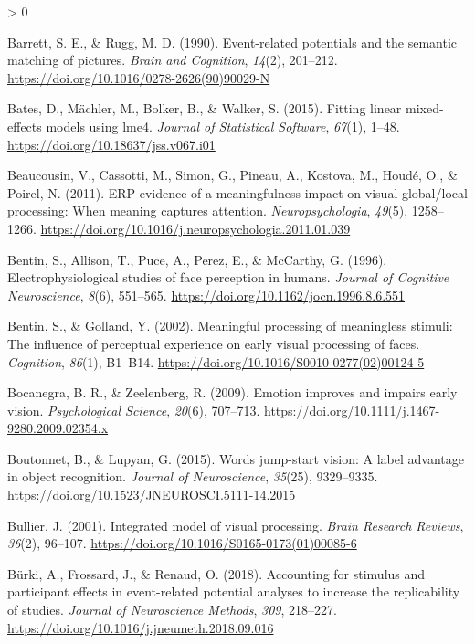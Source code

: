 \documentclass[
  english,
  doc,12pt,twoside,floatsintext]{apa7}
\newlength{\cslhangindent}
\newenvironment{CSLReferences}[2] %
 {%
  \setlength{\parindent}{0pt}
  \ifodd #1 \everypar{\setlength{\hangindent}{\cslhangindent}}\ignorespaces\fi
  \ifnum #2 > 0
  \setlength{\parskip}{#2\baselineskip}
  \fi
 }%
 {}
\begin{document}
\begin{CSLReferences}{1}{0}
\leavevmode\hypertarget{ref-barrett1990}{}%
Barrett, S. E., \& Rugg, M. D. (1990). Event-related potentials and the semantic matching of pictures. \emph{Brain and Cognition}, \emph{14}(2), 201--212. \url{https://doi.org/10.1016/0278-2626(90)90029-N}

\leavevmode\hypertarget{ref-R-lme4}{}%
Bates, D., Mächler, M., Bolker, B., \& Walker, S. (2015). Fitting linear mixed-effects models using {lme4}. \emph{Journal of Statistical Software}, \emph{67}(1), 1--48. \url{https://doi.org/10.18637/jss.v067.i01}

\leavevmode\hypertarget{ref-beaucousin2011}{}%
Beaucousin, V., Cassotti, M., Simon, G., Pineau, A., Kostova, M., Houdé, O., \& Poirel, N. (2011). ERP evidence of a meaningfulness impact on visual global/local processing: When meaning captures attention. \emph{Neuropsychologia}, \emph{49}(5), 1258--1266. \url{https://doi.org/10.1016/j.neuropsychologia.2011.01.039}

\leavevmode\hypertarget{ref-bentin1996}{}%
Bentin, S., Allison, T., Puce, A., Perez, E., \& McCarthy, G. (1996). Electrophysiological studies of face perception in humans. \emph{Journal of Cognitive Neuroscience}, \emph{8}(6), 551--565. \url{https://doi.org/10.1162/jocn.1996.8.6.551}

\leavevmode\hypertarget{ref-bentin2002}{}%
Bentin, S., \& Golland, Y. (2002). Meaningful processing of meaningless stimuli: The influence of perceptual experience on early visual processing of faces. \emph{Cognition}, \emph{86}(1), B1--B14. \url{https://doi.org/10.1016/S0010-0277(02)00124-5}

\leavevmode\hypertarget{ref-bocanegra2009}{}%
Bocanegra, B. R., \& Zeelenberg, R. (2009). Emotion improves and impairs early vision. \emph{Psychological Science}, \emph{20}(6), 707--713. \url{https://doi.org/10.1111/j.1467-9280.2009.02354.x}

\leavevmode\hypertarget{ref-boutonnet2015}{}%
Boutonnet, B., \& Lupyan, G. (2015). Words jump-start vision: A label advantage in object recognition. \emph{Journal of Neuroscience}, \emph{35}(25), 9329--9335. \url{https://doi.org/10.1523/JNEUROSCI.5111-14.2015}

\leavevmode\hypertarget{ref-bullier2001}{}%
Bullier, J. (2001). Integrated model of visual processing. \emph{Brain Research Reviews}, \emph{36}(2), 96--107. \url{https://doi.org/10.1016/S0165-0173(01)00085-6}

\leavevmode\hypertarget{ref-buxfcrki2018}{}%
Bürki, A., Frossard, J., \& Renaud, O. (2018). Accounting for stimulus and participant effects in event-related potential analyses to increase the replicability of studies. \emph{Journal of Neuroscience Methods}, \emph{309}, 218--227. \url{https://doi.org/10.1016/j.jneumeth.2018.09.016}


\end{CSLReferences}
\end{document}

